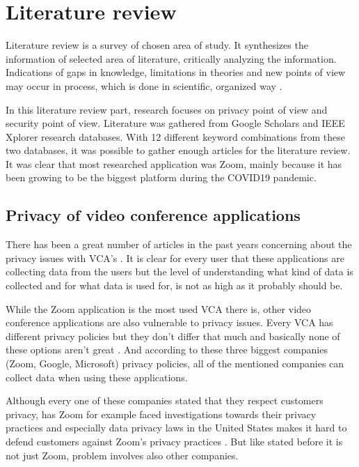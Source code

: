 \documentclass[utf8,english]{gradu3}
\begin{document}
\chapter{Literature review}
\label{literatureReview}
Literature review is a survey of chosen area of study. It synthesizes the information of selected area of literature, critically analyzing the information. Indications of gaps in knowledge, limitations in theories and new points of view may occur in process, which is done in scientific, organized way \parencite{literatureRoyal}.

In this literature review part, research focuses on privacy point of view and security point of view.
Literature was gathered from Google Scholars and IEEE Xplorer research databases. With 12 different keyword combinations from these two databases, it was possible to gather enough articles for the literature review. It was clear that most researched application was Zoom, mainly because it has been growing to be the biggest platform during the COVID19 pandemic.

\section{Privacy of video conference applications}
There has been a great number of articles in the past years concerning about the privacy issues with VCA's \parencite{vcadata}. It is clear for every user that these applications are collecting data from the users but the level of understanding what kind of data is collected and for what data is used for, is not as high as it probably should be.

While the Zoom application is the most used VCA there is, other video conference applications are also vulnerable to privacy issues. Every VCA has different privacy policies but they don't differ that much and basically none of these options aren't great \parencite{ZoomGoogleMS}. And according to these three biggest companies (Zoom, Google, Microsoft) privacy policies, all of the mentioned companies can collect data when using these applications. 

Although every one of these companies stated that they respect customers privacy, has Zoom for example faced investigations towards their privacy practices and especially data privacy laws in the United States makes it hard to defend customers against Zoom's privacy practices \parencite{Darkside}. But like stated before it is not just Zoom, problem involves also other companies.
\end{document}
